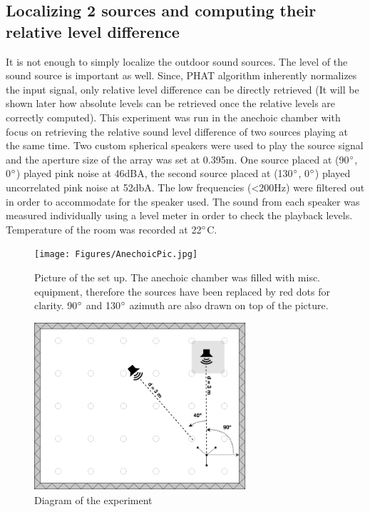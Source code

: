 \subsection{Localizing 2 sources and computing their relative level difference}
It is not enough to simply localize the outdoor sound sources. The level of the sound source is important as well. Since, PHAT algorithm inherently normalizes the input signal, only relative level difference can be directly retrieved (It will be shown later how absolute levels can be retrieved once the relative levels are correctly computed). This experiment was run in the anechoic chamber with focus on retrieving the relative sound level difference of two sources playing at the same time.  Two custom spherical speakers were used to play the source signal and the aperture size of the array was set at 0.395m. One source placed at (90$\degree$, 0$\degree$) played pink noise at 46dBA, the second source placed at (130$\degree$, 0$\degree$) played uncorrelated pink noise at 52dbA. The low frequencies (<200Hz) were filtered out in order to accommodate for the speaker used. The sound from each speaker was measured individually using a level meter in order to check the playback levels. Temperature of the room was recorded at 22$\degree$C.
\begin{figure}[H]
    \centering
    \texttt{[image: Figures/AnechoicPic.jpg]}
    \caption{Picture of the set up. The anechoic chamber was filled with misc. equipment, therefore the sources have been replaced by red dots for clarity. 90$\degree$ and 130$\degree$ azimuth are also drawn on top of the picture.}
    \label{fig:Anechoicpic1}
\end{figure}
\begin{figure}[H]
    \centering
    \includegraphics[width=0.7\textwidth]{Figures/Anechoicexp3.png}
    \caption{Diagram of the experiment}
    \label{fig:Anechoicexp3}
\end{figure}
